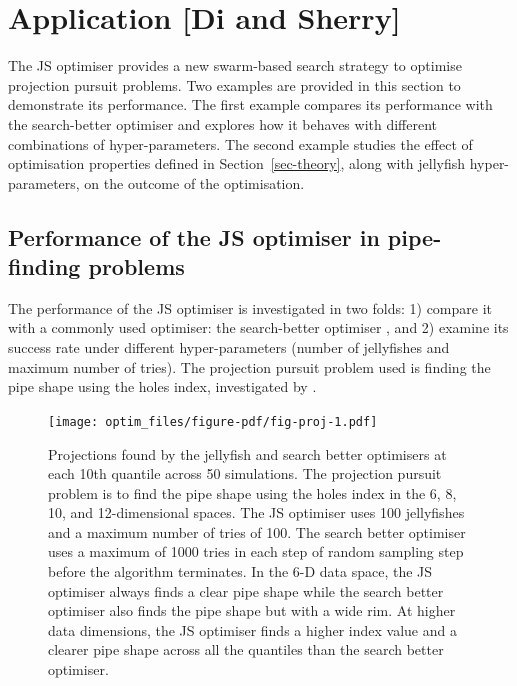 \documentclass[
  number,
  preprint,
  3p]{elsarticle}
\begin{document}
\hypertarget{sec-app}{%
\section{Application {[}Di and Sherry{]}}\label{sec-app}}

The JS optimiser provides a new swarm-based search strategy to optimise
projection pursuit problems. Two examples are provided in this section
to demonstrate its performance. The first example compares its
performance with the search-better optimiser and explores how it behaves
with different combinations of hyper-parameters. The second example
studies the effect of optimisation properties defined in
Section~\ref{sec-theory}, along with jellyfish hyper-parameters, on the
outcome of the optimisation.

\hypertarget{sec-app-1}{%
\subsection{Performance of the JS optimiser in pipe-finding
problems}\label{sec-app-1}}

The performance of the JS optimiser is investigated in two folds: 1)
compare it with a commonly used optimiser: the search-better optimiser
\citep{RJ-2021-105, laa_using_2020}, and 2) examine its success rate
under different hyper-parameters (number of jellyfishes and maximum
number of tries). The projection pursuit problem used is finding the
pipe shape using the holes index, investigated by
\citet{laa_using_2020}.

\begin{figure}

{\centering \texttt{[image: optim\_files/figure-pdf/fig-proj-1.pdf]}

}

\caption{\label{fig-proj}Projections found by the jellyfish and search
better optimisers at each 10th quantile across 50 simulations. The
projection pursuit problem is to find the pipe shape using the holes
index in the 6, 8, 10, and 12-dimensional spaces. The JS optimiser uses
100 jellyfishes and a maximum number of tries of 100. The search better
optimiser uses a maximum of 1000 tries in each step of random sampling
step before the algorithm terminates. In the 6-D data space, the JS
optimiser always finds a clear pipe shape while the search better
optimiser also finds the pipe shape but with a wide rim. At higher data
dimensions, the JS optimiser finds a higher index value and a clearer
pipe shape across all the quantiles than the search better optimiser.}

\end{figure}
\end{document}
